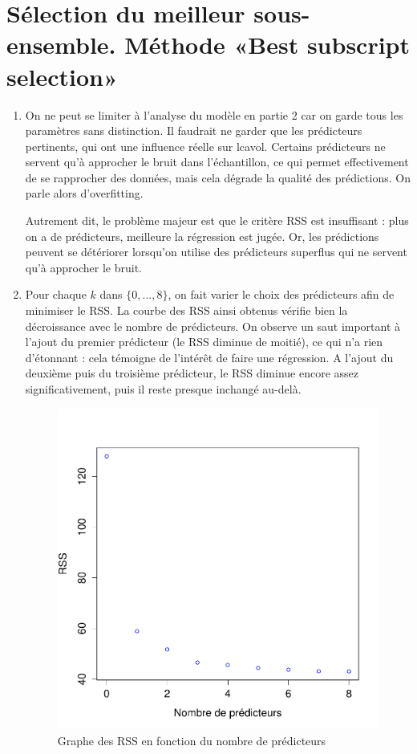 \documentclass[a4paper, 12pt]{article}
\begin{document}
\section{Sélection du meilleur sous-ensemble. Méthode «Best subscript selection»}

\begin{enumerate}

\item On ne peut se limiter à l'analyse du modèle en partie 2 car on garde tous les paramètres sans distinction. Il faudrait ne garder que les prédicteurs pertinents, qui ont une influence réelle sur lcavol. Certains prédicteurs ne servent qu'à approcher le bruit dans l'échantillon, ce qui permet effectivement de se rapprocher des données, mais cela dégrade la qualité des prédictions. On parle alors d'overfitting.

Autrement dit, le problème majeur est que le critère RSS est insuffisant : plus on a de prédicteurs, meilleure la régression est jugée. Or, les prédictions peuvent se détériorer lorsqu'on utilise des prédicteurs superflus qui ne servent qu'à approcher le bruit.

\item Pour chaque $k$ dans $\{0, ..., 8\}$, on fait varier le choix des prédicteurs afin de minimiser le RSS. La courbe des RSS ainsi obtenus vérifie bien la décroissance avec le nombre de prédicteurs. On observe un saut important à l'ajout du premier prédicteur (le RSS diminue de moitié), ce qui n'a rien d'étonnant : cela témoigne de l'intérêt de faire une régression. A l'ajout du deuxième puis du troisième prédicteur, le RSS diminue encore assez significativement, puis il reste presque inchangé au-delà.

\begin{figure}
\begin{center}
\includegraphics[scale=0.7]{rss.pdf}
\caption{Graphe des RSS en fonction du nombre de prédicteurs}
\end{center}
\end{figure}


\end{enumerate}
\end{document}
